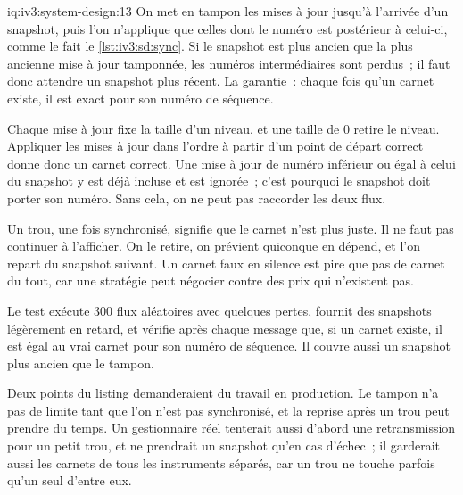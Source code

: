 \begin{solution}{iq:iv3:system-design:13}
On met en tampon les mises à jour jusqu'à l'arrivée d'un snapshot, puis l'on n'applique que celles dont le numéro est postérieur à celui-ci, comme le fait le \cref{lst:iv3:sd:sync}. Si le snapshot est plus ancien que la plus ancienne mise à jour tamponnée, les numéros intermédiaires sont perdus~; il faut donc attendre un snapshot plus récent. La garantie~: chaque fois qu'un carnet existe, il est exact pour son numéro de séquence.
\label{lst:iv3:sd:sync}

Chaque mise à jour fixe la taille d'un niveau, et une taille de 0 retire le niveau. Appliquer les mises à jour dans l'ordre à partir d'un point de départ correct donne donc un carnet correct. Une mise à jour de numéro inférieur ou égal à celui du snapshot y est déjà incluse et est ignorée~; c'est pourquoi le snapshot doit porter son numéro. Sans cela, on ne peut pas raccorder les deux flux.

Un trou, une fois synchronisé, signifie que le carnet n'est plus juste. Il ne faut pas continuer à l'afficher. On le retire, on prévient quiconque en dépend, et l'on repart du snapshot suivant. Un carnet faux en silence est pire que pas de carnet du tout, car une stratégie peut négocier contre des prix qui n'existent pas.

Le test exécute 300 flux aléatoires avec quelques pertes, fournit des snapshots légèrement en retard, et vérifie après chaque message que, si un carnet existe, il est égal au vrai carnet pour son numéro de séquence. Il couvre aussi un snapshot plus ancien que le tampon.

Deux points du listing demanderaient du travail en production. Le tampon n'a pas de limite tant que l'on n'est pas synchronisé, et la reprise après un trou peut prendre du temps. Un gestionnaire réel tenterait aussi d'abord une retransmission pour un petit trou, et ne prendrait un snapshot qu'en cas d'échec~; il garderait aussi les carnets de tous les instruments séparés, car un trou ne touche parfois qu'un seul d'entre eux.

\end{solution}

